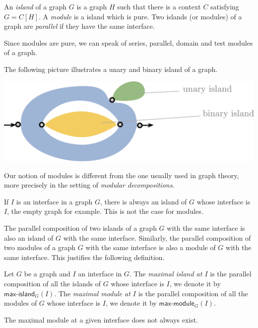 \begin{definition}  
An \emph{island} of a graph $G$ is a graph $H$ such that there is a context $C$ satisfying $G=C[H]$.  A \emph{module} is a island which is pure.  Two islands (or modules) of a graph are \emph{parallel} if they have the same interface. 

\noindent Since modules are pure, we can speak of series, parallel, domain and test modules  of a graph. 
\end{definition}

The following picture illustrates a unary and binary island of a graph.
\begin{center}
\includegraphics[scale=.35]{Pictures/island}
\end{center}
\begin{remark} Our notion of modules is different from the one usually used in graph theory, more precisely in the setting of \emph{modular decompositions}. %
\end{remark}
 
 \begin{remark}
If $I$ is an interface in a graph $G$,  there is always an island of $G$ whose interface is $I$, the empty graph for example. This is not the case for modules.   
\end{remark}

\begin{remark}
The parallel composition of two islands of a graph $G$ with the same interface is also an island of $G$ with the same interface. Similarly, the parallel composition of two modules of a graph $G$ with the same interface is also a module of $G$ with the same interface. This justifies the following definition.
\end{remark}

\begin{definition}
 Let $G$ be a graph and $I$ an interface in $G$.  The \emph{maximal island  at $I$} is the parallel composition of all the islands of $G$ whose interface is $I$, we denote it by $\mathsf{max}\text{-}\mathsf{island}_G(I)$. The \emph{maximal module at $I$} is the parallel composition of all the modules of $G$ whose interface is $I$, we denote it by $\mathsf{max}\text{-}\mathsf{module}_G(I)$.
\end{definition}
\begin{remark}
The maximal module at a given interface does not always exist.
\end{remark}


